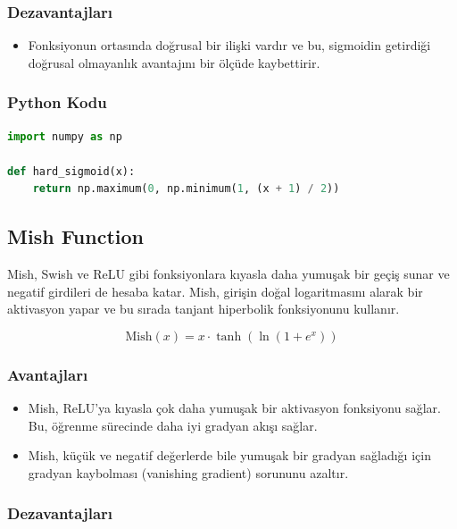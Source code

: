 \subsubsection{Dezavantajları}

\begin{itemize}
    \item Fonksiyonun ortasında doğrusal bir ilişki vardır ve bu, sigmoidin getirdiği doğrusal olmayanlık avantajını bir ölçüde kaybettirir.
\end{itemize}

\subsubsection{Python Kodu}

\begin{lstlisting}[language=Python]
import numpy as np

def hard_sigmoid(x):
    return np.maximum(0, np.minimum(1, (x + 1) / 2))
\end{lstlisting}

\newpage

\subsection{Mish Function}

Mish, Swish ve ReLU gibi fonksiyonlara kıyasla daha yumuşak bir geçiş sunar ve negatif girdileri de hesaba katar. Mish, girişin doğal logaritmasını alarak bir aktivasyon yapar ve bu sırada tanjant hiperbolik fonksiyonunu kullanır.

\[ \text{Mish}(x) = x \cdot \tanh(\ln(1 + e^x)) \]

\subsubsection{Avantajları}

\begin{itemize}
    \item Mish, ReLU'ya kıyasla çok daha yumuşak bir aktivasyon fonksiyonu sağlar. Bu, öğrenme sürecinde daha iyi gradyan akışı sağlar.
    \item Mish, küçük ve negatif değerlerde bile yumuşak bir gradyan sağladığı için gradyan kaybolması (vanishing gradient) sorununu azaltır.
\end{itemize}

\subsubsection{Dezavantajları}

